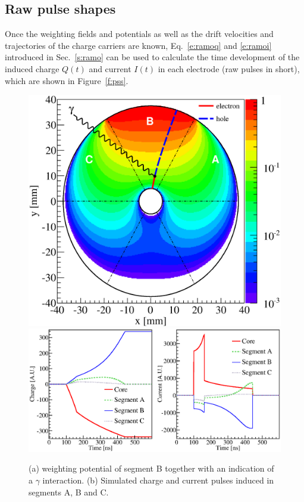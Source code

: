\documentclass[epj]{svjour}
\begin{document}
\subsection{Raw pulse shapes} 
\label{s:ps} 
Once the weighting fields and potentials as well as the drift
velocities and trajectories of the charge carriers are known,
Eq.~\ref{e:ramoq} and \ref{e:ramoi} introduced in Sec.~\ref{s:ramo}
can be used to calculate the time development of the induced charge
$Q(t)$ and current $I(t)$ in each electrode (raw pulses in short),
which are shown in Figure~\ref{f:pss}.
\begin{figure}\centering
\includegraphics[height=0.23\textheight]{WP}
\includegraphics[height=0.23\textheight]{CIPS}
\caption{(a) weighting potential of segment B together with an
indication of a $\gamma$ interaction. (b) Simulated charge and current
pulses induced in segments A, B and C.}
\label{fig:pss:ps} 
\end{figure}
\end{document}
